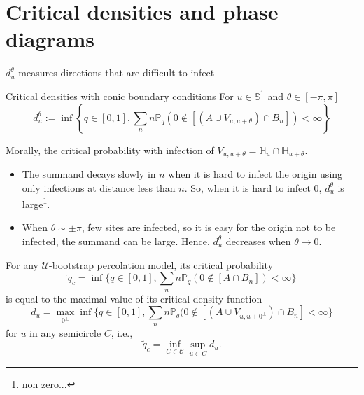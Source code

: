 
\section{Critical densities and phase diagrams}
\begin{frame}{$d_u^\theta$ measures directions that are difficult to infect}
	\begin{block}{Critical densities with conic boundary conditions}
		For $u\in \mathbb{S}^1$ and $\theta\in[-\pi, \pi]$
		$$d_u^\theta := \inf\left\{q\in[0,1], \sum_n n\mathbb{P}_q(0\not\in [(A\cup V_{u,u+\theta})\cap B_n]) < \infty\right\}$$
	\end{block}
	Morally, the critical probability with infection of $V_{u,u+\theta} = \mathbb{H}_u \cap \mathbb{H}_{u+\theta}$. 
	\begin{itemize}
		\item The summand decays slowly in $n$ when it is hard to infect the origin using only infections at distance less than $n$. So, when it is hard to infect 0,  $d_u^\theta$ is large\footnote{non zero...}.
		\item When $\theta \sim \pm \pi$, few sites are infected, so it is easy for the origin not to be infected, the summand can be large. Hence, $d_u^\theta$ decreases when $\theta\to 0$.
	\end{itemize}
\end{frame}




\begin{frame}

	\begin{theorem}
		For any $\mathcal{U}$-bootstrap percolation model, its critical probability
		\begin{equation*}
			\tilde q_c = \inf\{q\in[0,1], \sum_n n\mathbb{P}_q(0\not\in [A\cap B_n]) < \infty\}
		\end{equation*}
		is equal to the maximal value of its critical density function
		\begin{equation*}
			d_u = \max_{0^\pm} \inf\{q\in[0,1], \sum_n n\mathbb{P}_q(0\not\in[(A\cup V_{u, u + 0^\pm})\cap B_n] < \infty\}
		\end{equation*}
		for $u$ in any semicircle $C$, i.e.,
		\begin{equation*}
			\tilde q_c = \inf_{C\in \mathcal{C}} \sup_{u\in C} d_u.
		\end{equation*}

	\end{theorem}

\end{frame}

